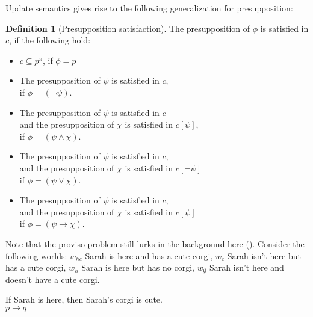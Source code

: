 \documentclass[nols,twoside,nofonts,nobib,nohyper]{tufte-handout}
\theoremstyle{definition}
\newtheorem{definition}{Definition}[section]
\begin{document}
Update semantics gives rise to the following generalization for presupposition:

\begin{definition}[Presupposition satisfaction] The presupposition of  $ϕ$ is satisfied in $c$, if the following hold:

  \begin{itemize}
      \item $c \subseteq p^{π}$, if $ϕ = p$
    \item The presupposition of $ψ$ is satisfied in $c$,\\
      if $ϕ = (¬ ψ)$.
    \item The presupposition of $ψ$ is satisfied in $c$\\
      and the presupposition of $χ$ is satisfied in $c[ψ]$,\\
      if $ϕ = (ψ ∧ χ)$.
    \item The presupposition of $ψ$ is satisfied in $c$,\\
      and the presupposition of $χ$ is satisfied in $c[¬ ψ]$\\
      if $ϕ = (ψ ∨ χ)$.
    \item The presupposition of $ψ$ is satisfied in $c$,\\
      and the presupposition of $χ$ is satisfied in $c[ψ]$\\
      if $ϕ = (ψ → χ)$.
  \end{itemize}

\end{definition}

Note that the proviso problem still lurks in the background here (\citealt{Geurts1996}). Consider the following worlds: $w_{hc}$ Sarah is here and has a cute corgi, $w_{c}$ Sarah isn't here but has a cute corgi, $w_{h}$ Sarah is here but has no corgi, $w_{∅}$ Sarah isn't here and doesn't have a cute corgi.

\ex
If Sarah is here, then Sarah's corgi is cute.\\
$p → q$
\xe
\end{document}
